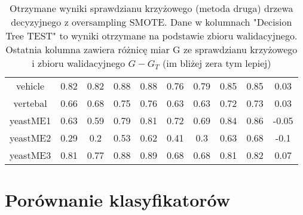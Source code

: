 \begin{table}[H]
\begin{center}
{\begin{tabular}{|c|c|c|c|c|c|c|c|c|c|}
			vehicle&0.82&0.82&0.88&0.88&0.76&0.79&0.85&0.85&0.03\\%
			vertebal&0.66&0.68&0.75&0.76&0.63&0.63&0.72&0.73&0.03\\%
			yeastME1&0.63&0.59&0.79&0.81&0.72&0.69&0.84&0.86&{-}0.05\\%
			yeastME2&0.29&0.2&0.53&0.62&0.41&0.3&0.63&0.68&{-}0.1\\%
			yeastME3&0.81&0.77&0.88&0.89&0.68&0.68&0.81&0.82&0.07\\%
			\hline%
		\end{tabular}}%
			\caption{Otrzymane wyniki sprawdzianu krzyżowego (metoda druga) drzewa decyzyjnego z oversampling SMOTE. Dane w kolumnach "Decision Tree TEST" to wyniki otrzymane na podstawie zbioru walidacyjnego. Ostatnia kolumna zawiera różnicę  miar G ze sprawdzianu krzyżowego i zbioru walidacyjnego $G-G_T$ (im bliżej zera tym lepiej)}
			\label{CVoversampling2}
	\end{center}
\end{table}

\section{Porównanie klasyfikatorów}

